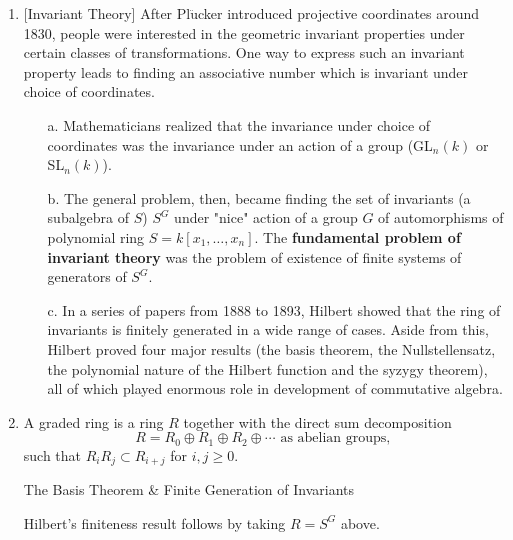 \begin{enumerate}
            that were developed to handle number fields could be applied to geometrically defined fields, thus
            pioneering the "arithmetic approach to function theory."
      \item
            $[$Invariant Theory]
                  After Pl$\ddot{\text{u}}$cker introduced projective coordinates around 1830, people were
            interested in the geometric invariant properties under certain classes of transformations. One way to
            express such an invariant property leads to finding an associative number which is invariant under
            choice of coordinates.
            \begin{enumerate}
                  \item[a.]
                        Mathematicians realized that the invariance under choice of coordinates was the invariance
                        under an action of a group (GL$_n(k)$ or SL$_n(k)$).
                  \item[b.]
                        The general problem, then, became finding the set of invariants (a subalgebra of $S$) $S^G$ under
                        "nice" action of a group $G$ of automorphisms of polynomial ring $S=k[x_1,\ldots,x_n]$.
                        The \textbf{fundamental problem of invariant theory} was the problem of existence of
                        finite systems of generators of $S^G$.
                  \item[c.]
                        In a series of papers from 1888 to 1893, Hilbert showed that the ring of invariants is finitely
                        generated in a wide range of cases. Aside from this, Hilbert proved four major results (the basis
                        theorem, the Nullstellensatz, the polynomial nature of the Hilbert function and the syzygy theorem),
                        all of which played enormous role in development of commutative algebra.
            \end{enumerate}
      \item
            A graded ring is a ring $R$ together with the direct sum decomposition
            $$R=R_0\oplus R_1 \oplus R_2\oplus\cdots \text{ as abelian groups},$$
            such that $R_iR_j \subset R_{i+j}$ for $i,j\geq 0$.
            \begin{mybox}{The Basis Theorem \& Finite Generation of Invariants}
                  
                  
                  Hilbert's finiteness result follows by taking $R=S^G$ above.
            \end{mybox}


\end{enumerate}
